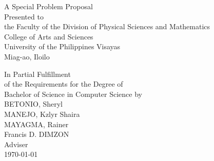 \begin{titlepage}
\centering


\vspace{1.75cm}
A Special Problem Proposal\\
Presented to\\
the Faculty of the Division of Physical Sciences and Mathematics\\
College of Arts and Sciences\\
University of the Philippines Visayas\\
Miag-ao, Iloilo

\vspace{1.75cm}
In Partial Fulfillment\\
of the Requirements for the Degree of\\
Bachelor of Science in Computer Science
\vspace{1.75cm}
by\\

\vspace{1cm}
BETONIO, Sheryl  \\
MANEJO, Kzlyr Shaira  \\
MAYAGMA, Rainer  \\

\vspace{1.75cm}
Francis D. DIMZON \\
Adviser\\

\vspace{1.75cm}
\today
\end{titlepage}
